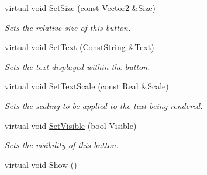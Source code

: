 \begin{DoxyCompactItemize}
virtual void \hyperlink{classMezzanine_1_1UI_1_1TextButton_a066e09081624a520a5e86f7cfd81ee5d}{SetSize} (const \hyperlink{classMezzanine_1_1Vector2}{Vector2} \&Size)
\begin{DoxyCompactList}\small\item\em Sets the relative size of this button. \item\end{DoxyCompactList}\item 
virtual void \hyperlink{classMezzanine_1_1UI_1_1TextButton_a8e3d1d82b3e50cacd6189361eb7ea058}{SetText} (\hyperlink{namespaceMezzanine_a63cd699ac54b73953f35ec9cfc05e506}{ConstString} \&Text)
\begin{DoxyCompactList}\small\item\em Sets the text displayed within the button. \item\end{DoxyCompactList}\item 
virtual void \hyperlink{classMezzanine_1_1UI_1_1TextButton_ad9265dea19c5e84e2dd29bc40e4d8351}{SetTextScale} (const \hyperlink{namespaceMezzanine_a726731b1a7df72bf3583e4a97282c6f6}{Real} \&Scale)
\begin{DoxyCompactList}\small\item\em Sets the scaling to be applied to the text being rendered. \item\end{DoxyCompactList}\item 
virtual void \hyperlink{classMezzanine_1_1UI_1_1TextButton_a0e7af5bb48039675e31ddcd1f72f5752}{SetVisible} (bool Visible)
\begin{DoxyCompactList}\small\item\em Sets the visibility of this button. \item\end{DoxyCompactList}\item 
\hypertarget{classMezzanine_1_1UI_1_1TextButton_af6c3fdd8f3bf8797497f95bfd47db117}{
virtual void \hyperlink{classMezzanine_1_1UI_1_1TextButton_af6c3fdd8f3bf8797497f95bfd47db117}{Show} ()}
\label{classMezzanine_1_1UI_1_1TextButton_af6c3fdd8f3bf8797497f95bfd47db117}


\end{DoxyCompactItemize}
